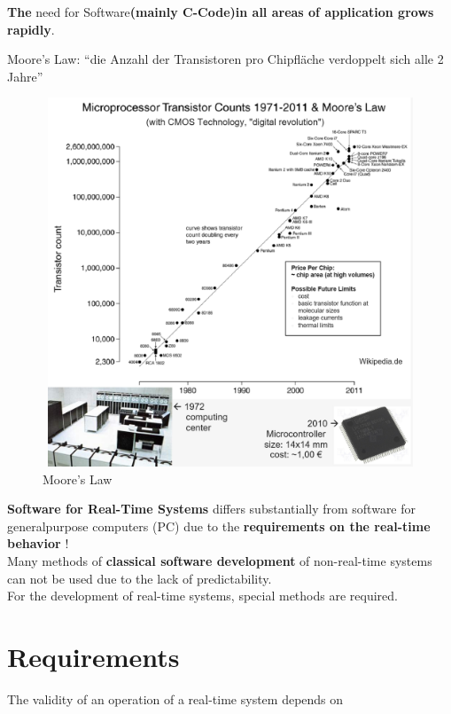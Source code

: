 \textbf{The} need for Software\textbf{(mainly C-Code)in all areas of application grows rapidly}. 

\begin{tcolorbox}[colback=blue!5!white,colframe=blue!75!black]
  Moore's Law: “die Anzahl der Transistoren pro Chipfläche verdoppelt sich alle 2 Jahre”
\end{tcolorbox}

\begin{figure}[h]
    \centering
    \includegraphics[width=15cm, height=11cm]{Images/image9.png}
    \caption{Moore's Law}
    \label{fig:Fig 3}
\end{figure}

\textbf{ Software for Real-Time Systems} differs substantially from software for generalpurpose computers (PC) due to the \textbf{requirements on the real-time behavior} !\\

Many methods of \textbf{classical software development} of non-real-time systems can not be used due to the lack of predictability.\\

For the development of real-time systems, special methods are required.\\
\newpage

\section{ Requirements}

The validity of an operation of a real-time system depends on

